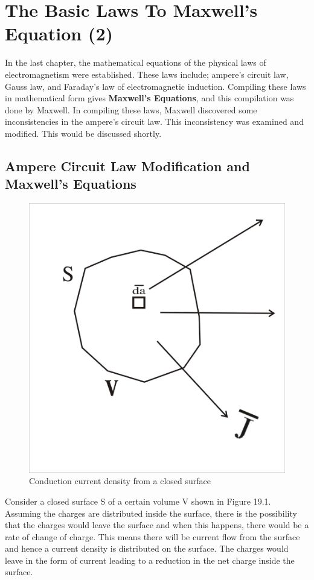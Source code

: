 \chapter{The Basic Laws To Maxwell's Equation (2)}\label{lec:lec19}
In the last chapter, the mathematical equations of the physical laws of electromagnetism were established. These laws include; ampere's circuit law, Gauss law, and Faraday's law of electromagnetic induction. Compiling these laws in mathematical form gives \textbf{Maxwell's Equations}, and this compilation was done by Maxwell. In compiling these laws, Maxwell discovered some inconsistencies in the ampere's circuit law. This inconsistency was examined and modified. This would be discussed shortly.

\section{Ampere Circuit Law Modification and Maxwell's Equations}
\begin{figure}[h]
\centering
\includegraphics[width=.7\linewidth]{./graphics/closedsurface}
\caption{Conduction current density from a closed surface}
\end{figure}

Consider a closed surface S of a certain volume V shown in Figure 19.1. Assuming the charges are distributed inside the surface, there is the possibility that the charges would leave the surface and when this happens, there would be a rate of change of charge. This means there will be current flow from the surface and hence a current density is distributed on the surface. The charges would leave in the form of current leading to a reduction in the net charge inside the surface.

